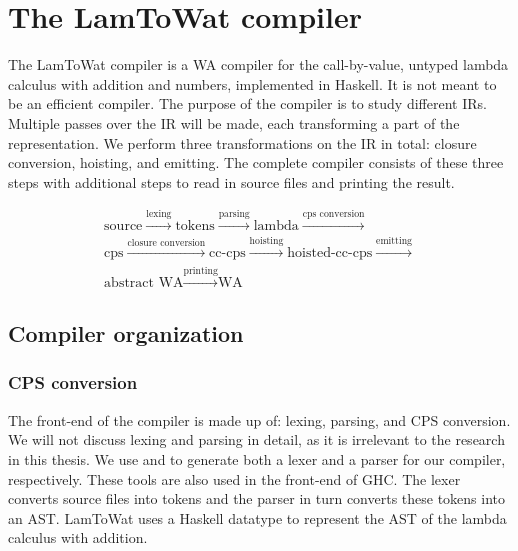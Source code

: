 
\chapter{\label{chap:compiler}The LamToWat compiler}

The LamToWat compiler is a \ac{WA} compiler for the call-by-value, untyped lambda calculus with addition and numbers, implemented in Haskell. It is not meant to be an efficient compiler. The purpose of the compiler is to study different \acp{IR}. Multiple passes over the \ac{IR} will be made, each transforming a part of the representation. We perform three transformations on the \ac{IR} in total: closure conversion, hoisting, and emitting. The complete compiler consists of these three steps with additional steps to read in source files and printing the result.

\begin{gather*}
  \mbox{source} \xrightarrow{\mbox{lexing}} \mbox{tokens} \xrightarrow{\mbox{parsing}} \mbox{lambda} \xrightarrow{\mbox{cps conversion}} \\
  \mbox{cps} \xrightarrow{\mbox{closure conversion}} \mbox{cc-cps} \xrightarrow{\mbox{hoisting}} \mbox{hoisted-cc-cps} \xrightarrow{\mbox{emitting}} \\
  \mbox{abstract WA} \xrightarrow{\mbox{printing}} \mbox{WA}
\end{gather*}


\section{\label{section:comporg}Compiler organization}
\subsection{\label{section:cpsconvert}CPS conversion}

The front-end of the compiler is made up of: lexing, parsing, and \ac{CPS} conversion. We will not discuss lexing and parsing in detail, as it is irrelevant to the research in this thesis. We use  and  to generate both a lexer and a parser for our compiler, respectively. These tools are also used in the front-end of \ac{GHC}. The lexer converts source files into tokens and the parser in turn converts these tokens into an \ac{AST}. LamToWat uses a Haskell datatype to represent the \ac{AST} of the lambda calculus with addition. 

